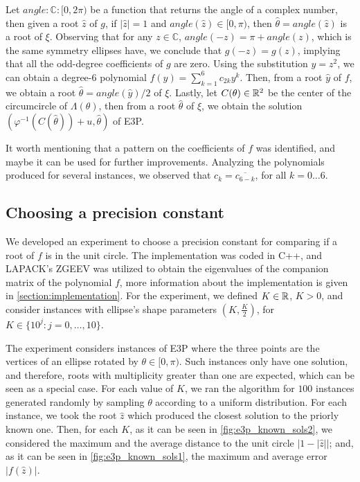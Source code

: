 Let $angle \colon \mathbb{C} \colon [0, 2\pi)$ be a function that returns the angle of a complex number, then given a root $\hat{z}$ of $g$, if $|\hat{z}|=1$ and $angle(\hat{z}) \in [0, \pi)$, then $\hat{\theta} = angle(\hat{z})$ is a root of $\xi$. Observing that for any $z\in \mathbb{C}$, $angle(-z)=\pi+angle(z)$, which is the same symmetry ellipses have, we conclude that $g(-z)=g(z)$, implying that all the odd-degree coefficients of $g$ are zero. Using the substitution $y=z^2$, we can obtain a degree-$6$ polynomial $f(y)=\sum_{k=1}^6 c_{2k} y^k$. Then, from a root $\hat{y}$ of $f$, we obtain a root $\hat{\theta} = angle(\hat{y})/2$ of $\xi$.
Lastly, let $C(\theta)\in \mathbb{R}^2$ be the center of the circumcircle of $\Lambda(\theta)$, then from a root $\hat{\theta}$ of $\xi$, we obtain the solution $(\varphi^{-1}(C(\hat{\theta})) + u, \hat{\theta})$ of E3P.

It worth mentioning that a pattern on the coefficients of $f$ was identified, and maybe it can be used for further improvements. Analyzing the polynomials produced for several instances, we observed that $c_k = \overline{c_{6-k}}$, for all $k=0\dots 6$.

\subsection{Choosing a precision constant}

We developed an experiment to choose a precision constant for comparing if a root of $f$ is in the unit circle. The implementation was coded in C++, and LAPACK's ZGEEV was utilized to obtain the eigenvalues of the companion matrix of the polynomial $f$, more information about the implementation is given in \autoref{section:implementation}. For the experiment, we defined $K\in\mathbb{R}$, $K>0$, and consider instances with ellipse's shape parameters $(K, \frac{K}{2})$, for $K\in\{10^j\colon j=0,\dots,10\}$.

The experiment considers instances of E3P where the three points are the vertices of an ellipse rotated by $\theta\in[0, \pi)$. Such instances only have one solution, and therefore, roots with multiplicity greater than one are expected, which can be seen as a special case.
For each value of $K$, we ran the algorithm for $100$ instances generated randomly by sampling $\theta$ according to a uniform distribution. For each instance, we took the root $\hat{z}$ which produced the closest solution to the priorly known one. Then, for each $K$, as it can be seen in \autoref{fig:e3p_known_sols2}, we considered the maximum and the average distance to the unit circle $|1-|\hat{z}||$; and, as it can be seen in \autoref{fig:e3p_known_sols1}, the maximum and average error $|f(\hat{z})|$.

